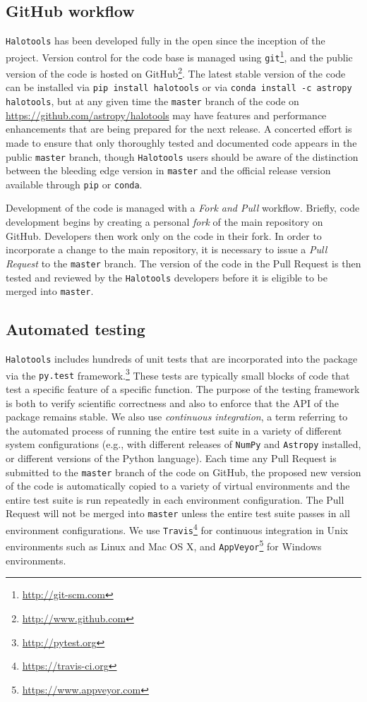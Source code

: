 \documentclass[twocolumn, tighten]{aastex6}
\begin{document}
\subsection{GitHub workflow}
\label{subsection:githubworkflow}

{\tt Halotools} has been developed fully in the open since the inception of the project. Version control for the code base is managed using {\tt git}\footnote{\url{http://git-scm.com}}, and the public version of the code is hosted on GitHub\footnote{\url{http://www.github.com}}. The latest stable version of the code can be installed via {\tt pip install halotools} or via {\tt conda install -c astropy halotools}, but at any given time the {\tt master} branch of the code on \url{https://github.com/astropy/halotools} may have features and performance enhancements that are being prepared for the next release. A concerted effort is made to ensure that only thoroughly tested and documented code appears in the public {\tt master} branch, though {\tt Halotools} users should be aware of the distinction between the bleeding edge version in {\tt master} and the official release version available through {\tt pip} or {\tt conda}.

Development of the code is managed with a {\em Fork and Pull} workflow. Briefly, code development begins by creating a personal {\em fork} of the main repository on GitHub. Developers then work only on the code in their fork. In order to incorporate a change to the main repository, it is necessary to issue a {\em Pull Request} to the {\tt master} branch. The version of the code in the Pull Request is then tested and reviewed by the {\tt Halotools} developers before it is eligible to be merged into {\tt master}.

\subsection{Automated testing}
\label{subsection:testing}

{\tt Halotools} includes hundreds of unit tests that are incorporated into the package via the {\tt py.test} framework.\footnote{\url{http://pytest.org}} These tests are typically small blocks of code that test a specific feature of a specific function. The purpose of the testing framework is both to verify scientific correctness and also to enforce that the API of the package remains stable. We also use {\em continuous integration}, a term referring to the automated process of running the entire test suite in a variety of different system configurations (e.g., with different releases of {\tt NumPy} and {\tt Astropy} installed, or different versions of the Python language). Each time any Pull Request is submitted to the {\tt master} branch of the code on GitHub, the proposed new version of the code is automatically copied to a variety of virtual environments and the entire test suite is run repeatedly in each environment configuration. The Pull Request will not be merged into {\tt master} unless the entire test suite passes in all environment configurations. We use {\tt Travis}\footnote{\url{https://travis-ci.org}} for continuous integration in Unix environments such as Linux and Mac OS X, and {\tt AppVeyor}\footnote{\url{https://www.appveyor.com}} for Windows environments.
\end{document}
